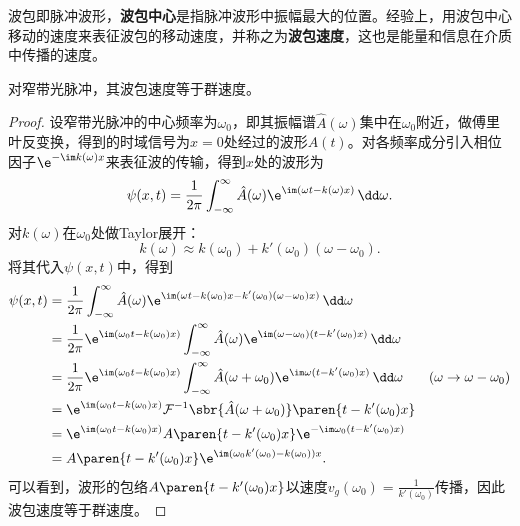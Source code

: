 \begin{definition}
    波包即脉冲波形，\textbf{波包中心}是指脉冲波形中振幅最大的位置。经验上，用波包中心移动的速度来表征波包的移动速度，并称之为\textbf{波包速度}，这也是能量和信息在介质中传播的速度。
\end{definition}
\begin{proposition}
    对窄带光脉冲，其波包速度等于群速度。
\end{proposition}
\begin{proof}
    设窄带光脉冲的中心频率为$\omega_0$，即其振幅谱$\hat{A}(\omega)$集中在$\omega_0$附近，做傅里叶反变换，得到的时域信号为$x=0$处经过的波形$A(t)$。对各频率成分引入相位因子$\e^{-\im k(\omega)x}$来表征波的传输，得到$x$处的波形为
    \begin{equation}
        \psi(x,t)=\frac{1}{2\pi}\int_{-\infty}^{\infty}\hat{A}(\omega)\e^{\im(\omega t-k(\omega)x)}\,\dd\omega.
    \end{equation}
    对$k(\omega)$在$\omega_0$处做Taylor展开：
    \begin{equation}
        k(\omega)\approx k(\omega_0)+k'(\omega_0)(\omega-\omega_0).
    \end{equation}
    将其代入$\psi(x,t)$中，得到
    \begin{align}
        \psi(x,t)&=\frac{1}{2\pi}\int_{-\infty}^{\infty}\hat{A}(\omega)\e^{\im(\omega t-k(\omega_0)x-k'(\omega_0)(\omega-\omega_0)x)}\,\dd\omega\nonumber\\
        &=\frac{1}{2\pi}\e^{\im(\omega_0 t-k(\omega_0)x)}\int_{-\infty}^{\infty}\hat{A}(\omega)\e^{\im(\omega - \omega_0)(t - k'(\omega_0)x)}\,\dd\omega\nonumber\\
        &=\frac{1}{2\pi}\e^{\im(\omega_0 t-k(\omega_0)x)}\int_{-\infty}^{\infty}\hat{A}(\omega+\omega_0)\e^{\im\omega(t - k'(\omega_0)x)}\,\dd\omega&(\omega\to\omega-\omega_0)\nonumber\\
        &=\e^{\im(\omega_0 t-k(\omega_0)x)}\mathcal{F}^{-1}\sbr{\hat{A}(\omega+\omega_0)}\paren{t - k'(\omega_0)x}\nonumber\\
        &=\e^{\im(\omega_0 t-k(\omega_0)x)}A\paren{t - k'(\omega_0)x}\e^{-\im\omega_0 (t- k'(\omega_0)x)}\nonumber\\
        &=A\paren{t - k'(\omega_0)x}\e^{\im(\omega_0 k'(\omega_0)-k(\omega_0))x}.
    \end{align}
    可以看到，波形的包络$A\paren{t - k'(\omega_0)x}$以速度$\displaystyle v_g(\omega_0)=\frac{1}{k'(\omega_0)}$传播，因此波包速度等于群速度。
\end{proof}

